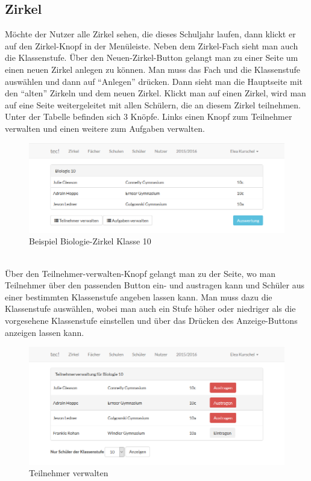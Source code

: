 \subsection{Zirkel}
Möchte der Nutzer alle Zirkel sehen, die dieses Schuljahr laufen, dann klickt er auf den Zirkel-Knopf in der Menüleiste. Neben dem Zirkel-Fach sieht man auch die Klassenstufe. Über den Neuen-Zirkel-Button gelangt man zu einer Seite um einen neuen Zirkel anlegen zu können. Man muss das Fach und die Klassenstufe auswählen und dann auf "`Anlegen"' drücken. Dann sieht man die Hauptseite mit den "`alten"' Zirkeln und dem neuen Zirkel. Klickt man auf einen Zirkel, wird man auf eine Seite weitergeleitet mit allen Schülern, die an diesem Zirkel teilnehmen. Unter der Tabelle befinden sich 3 Knöpfe. Links einen Knopf zum Teilnehmer verwalten und einen weitere zum Aufgaben verwalten.\\
\begin{figure}[ht]
	\centering
	\includegraphics[scale=.5]{bilder/Zirkel_Biologie.png}
	\caption{Beispiel Biologie-Zirkel Klasse 10}
	\label{abb:beispiel}
\end{figure}
\\Über den Teilnehmer-verwalten-Knopf gelangt man zu der Seite, wo man Teilnehmer über den passenden Button ein- und austragen kann und Schüler aus einer bestimmten Klassenstufe angeben lassen kann. Man muss dazu die Klassenstufe auswählen, wobei man auch ein Stufe höher oder niedriger als die vorgesehene Klassenstufe einstellen und über das Drücken des Anzeige-Buttons anzeigen lassen kann.\\
\begin{figure}[ht]
	\centering
	\includegraphics[scale=.5]{bilder/Teilnehmer_verwalten.png}
	\caption{Teilnehmer verwalten}
\end{figure}
